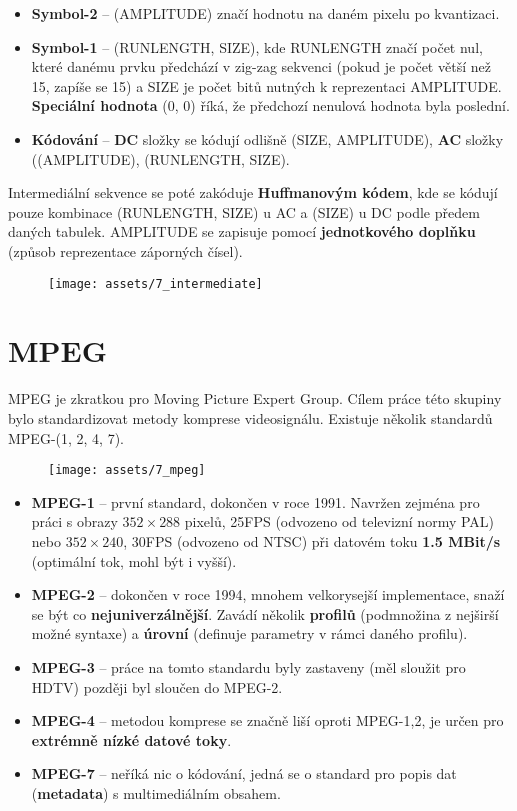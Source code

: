 \begin{enumerate}
          \begin{itemize}
              \item \textbf{Symbol-2} -- (AMPLITUDE) značí hodnotu na daném pixelu po kvantizaci.
              \item \textbf{Symbol-1} -- (RUNLENGTH, SIZE), kde RUNLENGTH značí počet nul, které danému prvku předchází v zig-zag sekvenci (pokud je počet větší než 15, zapíše se 15) a SIZE je počet bitů nutných k reprezentaci AMPLITUDE. \textbf{Speciální hodnota} (0, 0) říká, že předchozí nenulová hodnota byla poslední.
              \item \textbf{Kódování} -- \textbf{DC} složky se kódují odlišně (SIZE, AMPLITUDE), \textbf{AC} složky ((AMPLITUDE), (RUNLENGTH, SIZE).
          \end{itemize}
          Intermediální sekvence se poté zakóduje \textbf{Huffmanovým kódem}, kde se kódují pouze kombinace (RUNLENGTH, SIZE) u AC a (SIZE) u DC podle předem daných tabulek. AMPLITUDE se zapisuje pomocí \textbf{jednotkového doplňku} (způsob reprezentace záporných čísel).
          \begin{figure}[H]
              \centering
              \texttt{[image: assets/7\_intermediate]}
          \end{figure}
\end{enumerate}

\section{MPEG}
MPEG je zkratkou pro Moving Picture Expert Group. Cílem práce této skupiny bylo standardizovat metody komprese videosignálu. Existuje několik standardů MPEG-(1, 2, 4, 7).

\begin{figure}[H]
    \centering
    \texttt{[image: assets/7\_mpeg]}
\end{figure}

\begin{itemize}
    \item \textbf{MPEG-1} -- první standard, dokončen v roce 1991. Navržen zejména pro práci s obrazy $352\times288$ pixelů, 25FPS (odvozeno od televizní normy PAL) nebo $352\times240$, 30FPS (odvozeno od NTSC) při datovém toku \textbf{1.5 MBit/s} (optimální tok, mohl být i vyšší).
    \item \textbf{MPEG-2} -- dokončen v roce 1994, mnohem velkorysejší implementace, snaží se být co \textbf{nejuniverzálnější}. Zavádí několik \textbf{profilů} (podmnožina z nejširší možné syntaxe) a \textbf{úrovní} (definuje parametry v rámci daného profilu).
    \item \textbf{MPEG-3} -- práce na tomto standardu byly zastaveny (měl sloužit pro HDTV) později byl sloučen do MPEG-2.
    \item \textbf{MPEG-4} -- metodou komprese se značně liší oproti MPEG-1,2, je určen pro \textbf{extrémně nízké datové toky}.
    \item \textbf{MPEG-7} -- neříká nic o kódování, jedná se o standard pro popis dat (\textbf{metadata}) s multimediálním obsahem.
\end{itemize}

